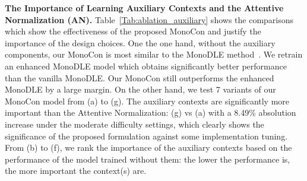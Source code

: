 \documentclass[letterpaper]{article} \usepackage{aaai22}  \usepackage{times}  \usepackage{helvet}  \usepackage{courier}  \usepackage[hyphens]{url}  \usepackage{graphicx} \urlstyle{rm} \def\UrlFont{\rm}  \usepackage{natbib}  \usepackage{caption} \DeclareCaptionStyle{ruled}{labelfont=normalfont,labelsep=colon,strut=off} \frenchspacing  \setlength{\pdfpagewidth}{8.5in}  \setlength{\pdfpageheight}{11in}  \usepackage{algorithm}
\begin{document}
\textbf{The Importance of Learning Auxiliary Contexts and the Attentive Normalization (AN).} Table~\ref{Tab:ablation_auxiliary} shows the comparisons which show the effectiveness of the proposed MonoCon and justify the importance of the design choices.  One the one hand, without the auxiliary components, our MonoCon is most similar to the MonoDLE method~\cite{monodle}. We retrain an enhanced  MonoDLE model which obtains significantly better performance than the vanilla MonoDLE. Our MonoCon still outperforms the enhanced MonoDLE by a large margin.  On the other hand, we test 7 variants of our MonoCon model from (a) to (g). The auxiliary contexts are significantly more important than the Attentive Normalization: (g) vs (a) with a 8.49\% absolution increase under the moderate difficulty settings, which clearly shows the significance of the proposed formulation against some implementation tuning. From (b) to (f), we rank the importance of the auxiliary contexts based on the performance of the model trained without them: the lower the performance is, the more important the context(s) are. 
\end{document}
